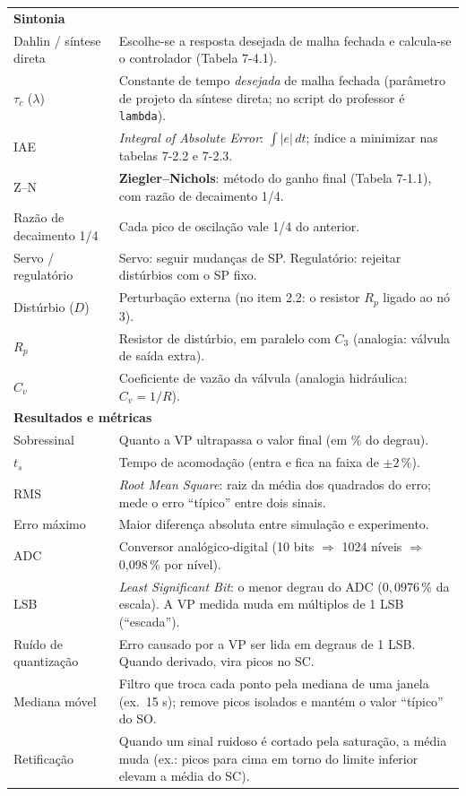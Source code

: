 \documentclass[11pt,a4paper]{article}
\begin{document}
\begin{center}
\begin{longtable}{p{2.7cm}p{12.3cm}}
\multicolumn{2}{l}{\textbf{Sintonia}}\\
Dahlin / síntese direta & Escolhe-se a resposta desejada de malha fechada e calcula-se o controlador (Tabela 7-4.1).\\
$\tau_c$ ($\lambda$) & Constante de tempo \emph{desejada} de malha fechada (parâmetro de projeto da síntese direta; no script do professor é \texttt{lambda}).\\
IAE & \emph{Integral of Absolute Error}: $\int|e|\,dt$; índice a minimizar nas tabelas 7-2.2 e 7-2.3.\\
Z--N & \textbf{Ziegler--Nichols}: método do ganho final (Tabela 7-1.1), com razão de decaimento 1/4.\\
Razão de decaimento 1/4 & Cada pico de oscilação vale 1/4 do anterior.\\
Servo / regulatório & Servo: seguir mudanças de SP. Regulatório: rejeitar distúrbios com o SP fixo.\\
Distúrbio ($D$) & Perturbação externa (no item 2.2: o resistor $R_p$ ligado ao nó 3).\\
$R_p$ & Resistor de distúrbio, em paralelo com $C_3$ (analogia: válvula de saída extra).\\
$C_v$ & Coeficiente de vazão da válvula (analogia hidráulica: $C_v=1/R$).\\
\multicolumn{2}{l}{\textbf{Resultados e métricas}}\\
Sobressinal & Quanto a VP ultrapassa o valor final (em \% do degrau).\\
$t_s$ & Tempo de acomodação (entra e fica na faixa de $\pm2\,\%$).\\
RMS & \emph{Root Mean Square}: raiz da média dos quadrados do erro; mede o erro ``típico'' entre dois sinais.\\
Erro máximo & Maior diferença absoluta entre simulação e experimento.\\
ADC & Conversor analógico-digital (10 bits $\Rightarrow$ 1024 níveis $\Rightarrow$ 0,098\,\% por nível).\\
LSB & \emph{Least Significant Bit}: o menor degrau do ADC ($0{,}0976\,\%$ da escala). A VP medida muda em múltiplos de 1 LSB (``escada'').\\
Ruído de quantização & Erro causado por a VP ser lida em degraus de 1 LSB. Quando derivado, vira picos no SC.\\
Mediana móvel & Filtro que troca cada ponto pela mediana de uma janela (ex.\ 15 s); remove picos isolados e mantém o valor ``típico'' do SO.\\
Retificação & Quando um sinal ruidoso é cortado pela saturação, a média muda (ex.: picos para cima em torno do limite inferior elevam a média do SC).\\

\end{longtable}
\end{center}
\end{document}
